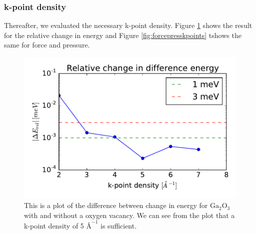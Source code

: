\subsubsection{k-point density}

Thereafter, we evaluated the necessary k-point density. Figure \ref{fig:totenkpoints} shows the result for the relative change in energy and Figure \ref{fig:forcepresskpoints} tshows the same for force and pressure. 

\begin{figure}[H]
\includegraphics[width=\linewidth]{../fig/deltatotencurverel_kpoints.pdf}\caption{This is a plot of the difference between change in energy for $\text{Ga}_2\text{O}_3$ with and without a oxygen vacancy. We can see from the plot that a k-point density of 5 $\text{Å}^{-1}$ is sufficient.}\label{fig:totenkpoints}
\end{figure}

